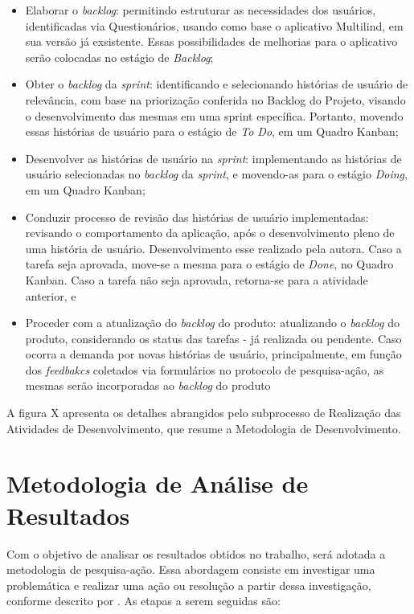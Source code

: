 \begin{itemize}
	\item Elaborar o \textit{backlog}: permitindo estruturar as necessidades dos usuários, identificadas via Questionários, usando como base o aplicativo Multilind, em sua versão já exsistente. Essas possibilidades de melhorias para o aplicativo serão colocadas no estágio de \textit{Backlog};
	\item Obter o \textit{backlog} da \textit{sprint}:  identificando e selecionando histórias de usuário de relevância, com base na priorização conferida no Backlog do Projeto, visando o desenvolvimento das mesmas em uma sprint específica. Portanto, movendo essas histórias de usuário para o estágio de
	\textit{To Do}, em um Quadro Kanban;
	\item Desenvolver as histórias de usuário na \textit{sprint}: implementando as histórias de usuário selecionadas no \textit{backlog} da \textit{sprint}, e movendo-as para o estágio \textit{Doing}, em um Quadro Kanban;
	\item Conduzir processo de revisão das histórias de usuário implementadas: revisando o comportamento da aplicação, após o desenvolvimento pleno de uma história de usuário. Desenvolvimento esse realizado pela autora. Caso a tarefa seja
	aprovada, move-se a mesma para o estágio de \textit{Done}, no Quadro Kanban. Caso a tarefa não seja aprovada, retorna-se para a atividade anterior, e
	\item Proceder com a atualização do \textit{backlog} do produto: atualizando o \textit{backlog} do produto, considerando os status das tarefas - já realizada ou pendente. Caso ocorra a demanda por novas histórias de usuário, principalmente, em função dos \textit{feedbakcs} coletados via formulários no protocolo de pesquisa-ação, as mesmas serão incorporadas ao \textit{backlog} do produto
\end{itemize}

A figura X apresenta os detalhes abrangidos pelo subprocesso de Realização das Atividades de Desenvolvimento, que resume a Metodologia de Desenvolvimento.

\section{Metodologia de Análise de Resultados}
\label{sec:Metodologia de Analise de Resultados}
Com o objetivo de analisar os resultados obtidos no trabalho, será adotada a metodologia de pesquisa-ação. Essa abordagem consiste em investigar uma problemática e realizar uma ação ou resolução a partir dessa investigação, conforme descrito por . As etapas a 
serem seguidas são:

